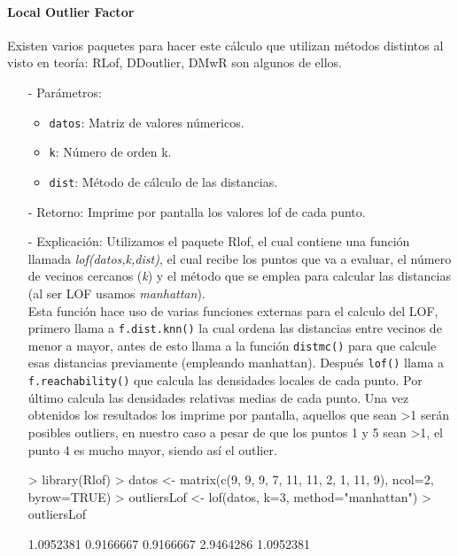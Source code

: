 \documentclass[a4paper, 12pt]{article}
\begin{document}
	\paragraph{Local Outlier Factor}
	Existen varios paquetes para hacer este cálculo que utilizan métodos distintos al visto en teoría: RLof, DDoutlier, DMwR son algunos de ellos.
	\begin{itemize}
		\item[-] Parámetros:
		\begin{itemize}
			\item \texttt{datos}: Matriz de valores númericos.
			\item \texttt{k}: Número de orden k.
			\item \texttt{dist}: Método de cálculo de las distancias.
		\end{itemize}

		\item[-] Retorno: Imprime por pantalla los valores lof de cada punto.
		
		\item[-] Explicación: Utilizamos el paquete Rlof, el cual contiene una función llamada \emph{lof(datos,k,dist)}, el cual recibe los puntos que va a evaluar, el número de vecinos cercanos (\emph{k}) y el método que se emplea para calcular las distancias (al ser LOF usamos \emph{manhattan}). \\
		Esta función hace uso de varias funciones externas para el calculo del LOF, primero llama a \texttt{f.dist.knn()} la cual ordena las distancias entre vecinos de menor a mayor, antes de esto llama a la función \texttt{distmc()} para que calcule esas distancias previamente (empleando manhattan). Después \texttt{lof()} llama a \texttt{f.reachability()} que calcula las densidades locales de cada punto. Por último calcula las densidades relativas medias de cada punto. Una vez obtenidos los resultados los imprime por pantalla, aquellos que sean >1 serán posibles outliers, en nuestro caso a pesar de que los puntos 1 y 5 sean >1, el punto 4 es mucho mayor, siendo así el outlier.\\ 
\begin{Schunk}
\begin{Sinput}
> library(Rlof)
> datos <- matrix(c(9, 9, 9, 7, 11, 11, 2, 1, 11, 9), ncol=2, byrow=TRUE)
> outliersLof <- lof(datos, k=3, method="manhattan")
> outliersLof
\end{Sinput}
\begin{Soutput}
[1] 1.0952381 0.9166667 0.9166667 2.9464286 1.0952381
\end{Soutput}
\end{Schunk}
	\end{itemize}
\end{document}

